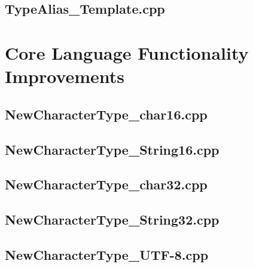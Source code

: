 \documentclass[11pt]{report}
\newcommand{\Cpp}{\lstset{language=C++,keywordstyle=\bfseries,breaklines,breakindent=30pt}}
\begin{document}
\begin{appendix}
\subsection{TypeAlias\_Template.cpp}
\label{TypeAlias_Template}




\section{Core Language Functionality Improvements}
\label{Appendix: corelanguage functionality improvements}

\Cpp

\subsection{NewCharacterType\_char16.cpp}
\label{NewCharacterType_char16}


\subsection{NewCharacterType\_String16.cpp}
\label{NewCharacterType_String16}


\subsection{NewCharacterType\_char32.cpp}
\label{NewCharacterType_char32}


\subsection{NewCharacterType\_String32.cpp}
\label{NewCharacterType_String32}


\subsection{NewCharacterType\_UTF-8.cpp}
\label{NewCharacterType_UTF-8}



\end{appendix}
\end{document}
